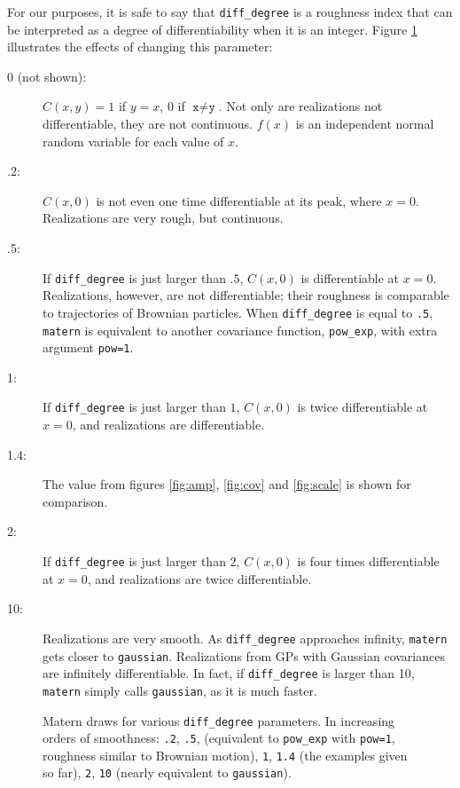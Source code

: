 For our purposes, it is safe to say that \texttt{diff_degree} is a roughness index that can be interpreted as a degree of differentiability when it is an integer. Figure \ref{fig:diffdegree} illustrates the effects of changing this parameter:
\begin{description}
    \item[0 (not shown):] $C(x,y)=1$ if $y=x$, $0$ if $\texttt{x}\ne \texttt{y}$. Not only are realizations not differentiable, they are not continuous. $f(x)$ is an independent normal random variable for each value of $x$.
    \item[.2:] $C(x,0)$ is not even one time differentiable at its peak, where $x=0$. Realizations are very rough, but continuous.
    \item[.5:] If \texttt{diff_degree} is just larger than $.5$, $C(x,0)$ is differentiable at $x=0$. Realizations, however, are not differentiable; their roughness is comparable to trajectories of Brownian particles. When \texttt{diff_degree} is equal to \texttt{.5}, \texttt{matern} is equivalent to another covariance function, \texttt{pow_exp}, with extra argument \texttt{pow=1}.
    \item[1:] If \texttt{diff_degree} is just larger than $1$, $C(x,0)$ is twice differentiable at $x=0$, and realizations are differentiable.
    \item[1.4:] The value from figures \ref{fig:amp}, \ref{fig:cov} and \ref{fig:scale} is shown for comparison.
    \item[2:] If \texttt{diff_degree} is just larger than $2$, $C(x,0)$ is four times differentiable at $x=0$, and realizations are twice differentiable.
    \item[10:] Realizations are very smooth. As \texttt{diff_degree} approaches infinity, \texttt{matern} gets closer to \texttt{gaussian}. Realizations from GPs with Gaussian covariances are infinitely differentiable. In fact, if \texttt{diff_degree} is larger than 10, \texttt{matern} simply calls \texttt{gaussian}, as it is much faster. 
\end{description}

\begin{figure}
    \centering
    \caption{Matern draws for various \texttt{diff_degree} parameters. In increasing orders of smoothness: \texttt{.2}, \texttt{.5}, (equivalent to \texttt{pow_exp} with \texttt{pow=1}, roughness similar to Brownian motion), \texttt{1}, \texttt{1.4} (the examples given so far), \texttt{2}, \texttt{10} (nearly equivalent to \texttt{gaussian}).}
    \label{fig:diffdegree}
\end{figure}


